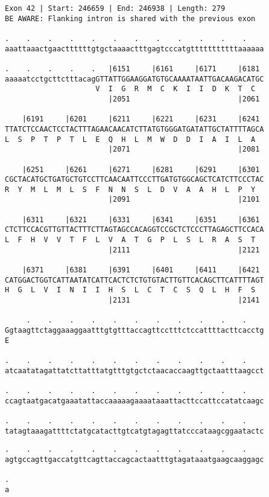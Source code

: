 \documentclass{article}
\begin{document}
\begin{Verbatim}[fontfamily=courier]
Exon 42 | Start: 246659 | End: 246938 | Length: 279
BE AWARE: Flanking intron is shared with the previous exon

.    .    .    .    .    .    .    .    .    .    .    .    
aaattaaactgaacttttttgtgctaaaactttgagtcccatgtttttttttttaaaaaa

.    .    .    .    .   |6151     |6161     |6171     |6181 
aaaaatcctgcttctttacagGTTATTGGAAGGATGTGCAAAATAATTGACAAGACATGC
                     V  I  G  R  M  C  K  I  I  D  K  T  C  
                        |2051                         |2061 

    |6191     |6201     |6211     |6221     |6231     |6241 
TTATCTCCAACTCCTACTTTAGAACAACATCTTATGTGGGATGATATTGCTATTTTAGCA
L  S  P  T  P  T  L  E  Q  H  L  M  W  D  D  I  A  I  L  A  
                        |2071                         |2081 

    |6251     |6261     |6271     |6281     |6291     |6301 
CGCTACATGCTGATGCTGTCCTTCAACAATTCCCTTGATGTGGCAGCTCATCTTCCCTAC
R  Y  M  L  M  L  S  F  N  N  S  L  D  V  A  A  H  L  P  Y  
                        |2091                         |2101 

    |6311     |6321     |6331     |6341     |6351     |6361 
CTCTTCCACGTTGTTACTTTCTTAGTAGCCACAGGTCCGCTCTCCCTTAGAGCTTCCACA
L  F  H  V  V  T  F  L  V  A  T  G  P  L  S  L  R  A  S  T  
                        |2111                         |2121 

    |6371     |6381     |6391     |6401     |6411     |6421 
CATGGACTGGTCATTAATATCATTCACTCTCTGTGTACTTGTTCACAGCTTCATTTTAGT
H  G  L  V  I  N  I  I  H  S  L  C  T  C  S  Q  L  H  F  S  
                        |2131                         |2141 

     .    .    .    .    .    .    .    .    .    .    .    
Ggtaagttctaggaaaggaatttgtgtttaccagttcctttctccattttacttcacctg
E                                                           

.    .    .    .    .    .    .    .    .    .    .    .    
atcaatatagattatcttatttatgtttgtgctctaacaccaagttgctaatttaagcct

.    .    .    .    .    .    .    .    .    .    .    .    
ccagtaatgacatgaaatattaccaaaaagaaaataaattacttccattccatatcaagc

.    .    .    .    .    .    .    .    .    .    .    .    
tatagtaaagattttctatgcatacttgtcatgtagagttatcccataagcggaatactc

\end{Verbatim}
\newpage
\begin{Verbatim}[fontfamily=courier]
.    .    .    .    .    .    .    .    .    .    .    .    
agtgccagttgaccatgttcagttaccagcactaatttgtagataaatgaagcaaggagc

.
a
\end{Verbatim}
\end{document}
